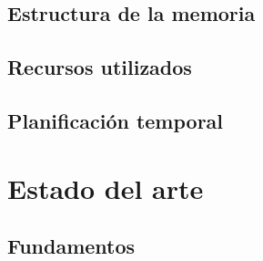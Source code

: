 \documentclass[twoside, openright, 11pt]{report}
\begin{document}
  \section{Estructura de la memoria}
  
  \section{Recursos utilizados}
  
  \section{Planificación temporal}
  

\chapter{Estado del arte}\label{cap.estado del arte}
	\section{Fundamentos}
\end{document}
